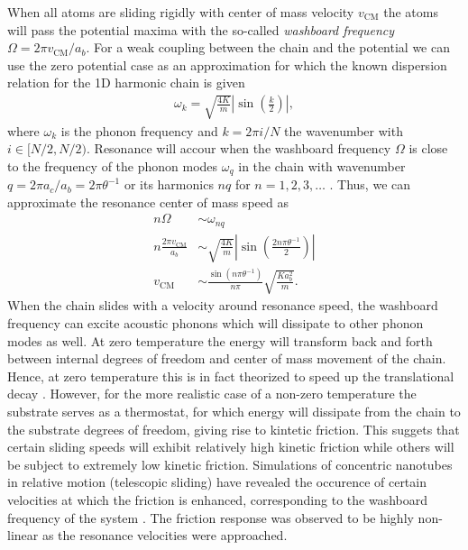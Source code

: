 When all atoms are sliding rigidly with center of mass velocity $v_{{\text{CM}}}$ the atoms will pass the potential maxima with the so-called \textit{washboard frequency} $\Omega = 2\pi v_{{\text{CM}}} / a_b$. For a weak coupling between the chain and the potential we can use the zero potential case as an approximation for which the known dispersion relation for the 1D harmonic chain is given \cite[p. 92]{Kittel2004}
\begin{align*}
  \omega_k = \sqrt{\frac{4 K}{m}} \left|\sin{\left(\frac{k}{2}\right)}\right|,
\end{align*}
where $\omega_k$ is the phonon frequency and $k = 2\pi i / N$ the wavenumber with $i\in [N/2, N/2)$. Resonance will accour when the washboard frequency $\Omega$ is close to the frequency of the phonon modes $\omega_q$ in the chain with wavenumber $q = 2\pi a_c / a_b = 2\pi \theta^{-1}$ or its harmonics $nq$ for $n = 1, 2, 3, \hdots$ \cite{van_den_Ende_2012}. Thus, we can approximate the resonance center of mass speed as
\begin{align*}
    n \Omega &\sim \omega_{nq} \\
    n \frac{2\pi v_{\text{CM}}}{a_b} &\sim \sqrt{\frac{4K}{m}} \left| \sin{\left(\frac{2n \pi \theta^{-1}}{2}\right)}\right| \\
    v_{\text{CM}} &\sim \frac{\sin{(n\pi \theta^{-1})}}{n \pi} \sqrt{\frac{Ka_b^2}{m}}.
\end{align*}
When the chain slides with a velocity around resonance speed, the washboard
frequency can excite acoustic phonons which will dissipate to other phonon modes
as well. At zero temperature the energy will transform back and forth between
internal degrees of freedom and center of mass movement of the chain. Hence, at
zero temperature this is in fact theorized to speed up the translational decay \cite{FK2D}.
However, for the more realistic case of a non-zero temperature the substrate
serves as a thermostat, for which energy will dissipate from the chain to the
substrate degrees of freedom, giving rise to kintetic friction. This suggets
that certain sliding speeds will exhibit relatively high kinetic friction while
others will be subject to extremely low kinetic friction. Simulations of
concentric nanotubes in relative motion (telescopic sliding) have revealed the
occurence of certain velocities at which the friction is enhanced, corresponding
to the washboard frequency of the system \cite{Manini_2016}. The friction
response was observed to be highly non-linear as the resonance velocities were
approached. 

